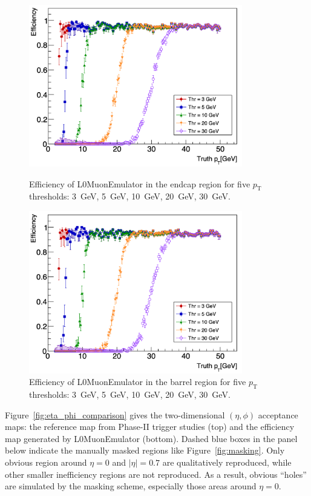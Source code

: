 \begin{figure}[htbp]
  \centering
  \includegraphics[width=0.83\textwidth]{figs/chapter4/efficiency_endcap_multi_right_new_new.png}
  \caption{Efficiency of L0MuonEmulator in the endcap region for five $p_\mathrm{T}$ thresholds: 3~GeV, 5~GeV, 10~GeV, 20~GeV, 30~GeV.}
  \label{fig:eff_pt_endcap}


  \includegraphics[width=0.83\textwidth]{figs/chapter4/efficiency_barrel_multi_right_new_new.png}
  \caption{Efficiency of L0MuonEmulator in the barrel region for five $p_\mathrm{T}$ thresholds: 3~GeV, 5~GeV, 10~GeV, 20~GeV, 30~GeV.}
  \label{fig:eff_pt_barrel}
\end{figure}

Figure~\ref{fig:eta_phi_comparison} gives the two-dimensional $(\eta, \phi)$ acceptance maps: the reference map from Phase-II trigger studies (top) and the efficiency map generated by L0MuonEmulator (bottom). Dashed blue boxes in the panel below indicate the manually masked regions like Figure~\ref{fig:masking}. Only obvious region around $\eta = 0$ and $|\eta| = 0.7$ are qualitatively reproduced, while other smaller inefficiency regions are not reproduced. As a result, obvious ``holes'' are simulated by the masking scheme, especially those areas around $\eta = 0$.

